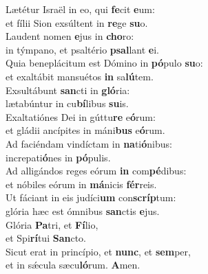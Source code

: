 \evenverse Lætétur Israël in eo, qui \textbf{fe}cit \textbf{e}um:~\*\\
\evenverse et fílii Sion exsúltent in \textbf{re}ge \textbf{su}o.\\
\oddverse Laudent nomen \textbf{e}jus in \textbf{cho}ro:~\*\\
\oddverse in týmpano, et psaltério \textbf{psal}lant \textbf{e}i.\\
\evenverse Quia beneplácitum est Dómino in \textbf{pó}pulo \textbf{su}o:~\*\\
\evenverse et exaltábit mansuétos \textbf{in} sa\textbf{lú}tem.\\
\oddverse Exsultábunt \textbf{san}cti in \textbf{gló}ria:~\*\\
\oddverse lætabúntur in cu\textbf{bí}libus \textbf{su}is.\\
\evenverse Exaltatiónes Dei in gúttu\textbf{re} e\textbf{ó}rum:~\*\\
\evenverse et gládii ancípites in máni\textbf{bus} e\textbf{ó}rum.\\
\oddverse Ad faciéndam vindíctam in \textbf{na}ti\textbf{ó}nibus:~\*\\
\oddverse increpati\textbf{ó}nes in \textbf{pó}pulis.\\
\evenverse Ad alligándos reges eórum \textbf{in} com\textbf{pé}dibus:~\*\\
\evenverse et nóbiles eórum in \textbf{má}nicis \textbf{fér}reis.\\
\oddverse Ut fáciant in eis judíci\textbf{um} con\textbf{scríp}tum:~\*\\
\oddverse glória hæc est ómnibus \textbf{san}ctis \textbf{e}jus.\\
\evenverse Glória \textbf{Pa}tri, et \textbf{Fí}lio,~\*\\
\evenverse et Spi\textbf{rí}tui \textbf{San}cto.\\
\oddverse Sicut erat in princípio, et \textbf{nunc}, et \textbf{sem}per,~\*\\
\oddverse et in sǽcula sæcu\textbf{ló}rum. \textbf{A}men.\\

